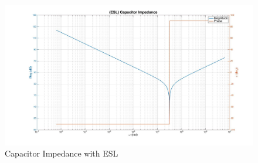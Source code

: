 \begin{figure}
\includegraphics[keepaspectratio=true,width=6in]{./figures/parameters/eslImp.jpg}
\centering
\caption{Capacitor Impedance with ESL}
\label{fig:eslPlot}
\end{figure}
